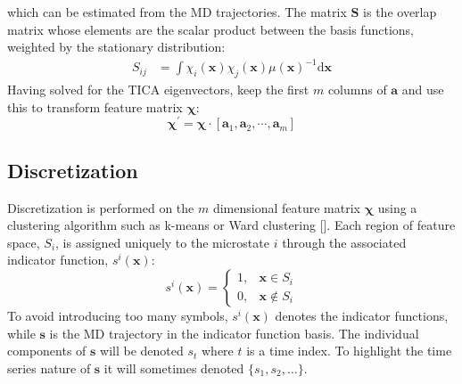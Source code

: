 which can be estimated from the MD trajectories. The matrix $\mathbf{S}$ is the overlap matrix whose elements are the scalar product between the basis functions, weighted by the stationary distribution: 
\begin{align}
    S_{ij} &= \int \chi_{i}(\mathbf{x})\chi_{j}(\mathbf{x})\mu(\mathbf{x})^{-1} \mathrm{d}\mathbf{x}
\end{align}
Having solved for the TICA eigenvectors, keep the first $m$ columns of $\mathbf{a}$ and use this to transform feature matrix $\bm{\chi}$: 
\begin{equation}
    \bm{\chi}^{\prime} = \bm{\chi}\cdot[\mathbf{a}_{1}, \mathbf{a}_{2}, \cdots,  \mathbf{a}_{m}]
\end{equation}

\subsection{Discretization}
Discretization is performed on the $m$ dimensional feature matrix $\bm{\chi}$ using a clustering algorithm such as k-means or Ward clustering []. Each region of feature space, $S_{i}$, is assigned uniquely to the microstate $i$ through the associated indicator function, $s^{i}(\mathbf{x})$:
\begin{equation}
s^{i}(\mathbf{x})=\left\{\begin{array}{ll}
1, & \mathbf{x} \in S_{i} \\
0, & \mathbf{x} \notin S_{i}
\end{array}\right.
\end{equation}
To avoid introducing too many symbols, $s^{i}(\mathbf{x})$ denotes the indicator functions, while $\mathbf{s}$ is the MD trajectory in the indicator function basis. The individual components of $\mathbf{s}$ will be denoted $s_{t}$ where $t$ is a time index. To highlight the time series nature of $\mathbf{s}$ it will sometimes denoted $\{s_{1}, s_{2}, \ldots \}$. 

